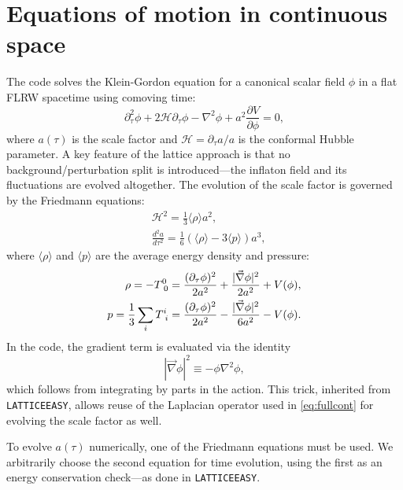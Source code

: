 \documentclass[aps, nofootinbib,superscriptaddress, preprintnumbers, longbibliography]{article}
\begin{document}
	\section{Equations of motion in continuous space}
	\label{sec:eoms}
	The code solves the Klein-Gordon equation for a canonical scalar field $\phi$ in a flat FLRW spacetime using comoving time:
\begin{equation}
\label{eq:fullcont}
\partial_\tau^2\phi + 2\mathcal{H}\partial_\tau \phi - \nabla^2\phi + a^2\frac{\partial V}{\partial \phi} = 0,
\end{equation}
where $a(\tau)$ is the scale factor and $\mathcal{H} = \partial_\tau a / a$ is the conformal Hubble parameter. A key feature of the lattice approach is that no background/perturbation split is introduced—the inflaton field and its fluctuations are evolved altogether.
The evolution of the scale factor is governed by the Friedmann equations:
\begin{align}
\label{eq:friedmann}
&\mathcal{H}^2 = \frac{1}{3} \langle \rho \rangle a^2,\\
&\frac{d^2a}{d\tau^2} = \frac{1}{6} \left(\langle \rho \rangle - 3 \langle p \rangle\right) a^3,
\end{align}
where $\langle \rho \rangle$ and $\langle p \rangle$ are the average energy density and pressure:
\begin{equation}
\begin{split}
\rho = -T^0_{\hspace{1mm}0} = \frac{(\partial_\tau\phi)^2}{2a^2} + \frac{|\vec\nabla\phi|^2}{2a^2} + V(\phi),\\
p = \frac{1}{3} \sum_i T^i_{\hspace{1mm}i} = \frac{(\partial_\tau\phi)^2}{2a^2} - \frac{|\vec\nabla\phi|^2}{6a^2} - V(\phi).
\end{split}
\label{eq:ED}
\end{equation}
In the code, the gradient term is evaluated via the identity
\[
|\vec\nabla\phi|^2 \equiv -\phi \nabla^2\phi,
\]
which follows from integrating by parts in the action. This trick, inherited from \texttt{LATTICEEASY}, allows reuse of the Laplacian operator used in \cref{eq:fullcont} for evolving the scale factor as well.

To evolve $a(\tau)$ numerically, one of the Friedmann equations must be used. We arbitrarily choose the second equation for time evolution, using the first as an energy conservation check—as done in \texttt{LATTICEEASY}.
\end{document}
